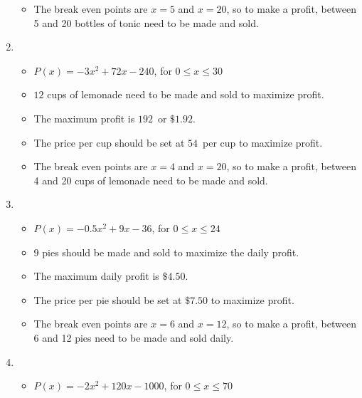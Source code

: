 \begin{enumerate}
\begin{itemize}
\item The break even points are $x=5$ and $x=20$, so to make a profit, between 5 and 20 bottles of tonic need to be made and sold.

\end{itemize}



\item \begin{itemize}

\item  $P(x) = -3x^2+72x-240$, for $0 \leq x \leq 30$

\item  $12$ cups of lemonade need to be made and sold to maximize profit.

\item  The maximum profit is $192$\textcent \, or $\$1.92$.

\item  The price per cup should be set at $54$\textcent \, per cup to maximize profit.

\item  The break even points are $x=4$ and $x=20$, so to make a profit, between 4 and 20 cups of lemonade need to be made and sold.


\end{itemize}


\item \begin{itemize}

\item $P(x) = -0.5 x^2+9x-36$, for $0 \leq x \leq 24$

\item  $9$ pies should be made and sold to maximize the daily profit.

\item The maximum daily profit is $\$4.50$.

\item  The price per pie should be set at $\$7.50$ to maximize profit.

\item  The break even points are $x=6$ and $x=12$, so to make a profit, between 6 and 12 pies  need to be made and sold daily.

\end{itemize}

\item \begin{itemize}

\item  $P(x) = -2x^2+120x-1000$, for $0 \leq x \leq 70$


\end{itemize}
\end{enumerate}

